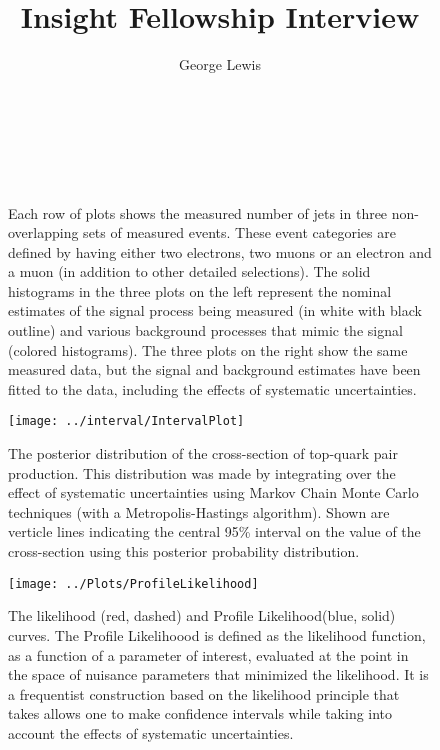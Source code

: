 \documentclass[11pt]{article}
\title{ Insight Fellowship Interview}
\author{ George Lewis }
\begin{document}
\maketitle


\begin{center}
  \begin{figure}[htbp]
     \\
     \\
     \\
    \caption{Each row of plots shows the measured number of jets in three non-overlapping sets of measured events. These event categories are defined by having either two electrons, two muons or an electron and a muon (in addition to other detailed selections).  The solid histograms in the three plots on the left represent the nominal estimates of the signal process being measured (in white with black outline) and various background processes that mimic the signal (colored histograms).  The three plots on the right show the same measured data, but the signal and background estimates have been fitted to the data, including the effects of systematic uncertainties.  }
  \end{figure}
\end{center}
\clearpage
\newpage



\begin{figure}[htbp]
  \begin{center}
    \texttt{[image: ../interval/IntervalPlot]}
    \caption{The posterior distribution of the cross-section of top-quark pair production.  This distribution was made by integrating over the effect of systematic uncertainties using Markov Chain Monte Carlo techniques (with a Metropolis-Hastings algorithm).  Shown are verticle lines indicating the central 95\% interval on the value of the cross-section using this posterior probability distribution.}
  \texttt{[image: ../Plots/ProfileLikelihood]}
    \caption{The likelihood (red, dashed) and Profile Likelihood(blue, solid) curves.  The Profile Likelihoood is defined as the likelihood function, as a function of a parameter of interest, evaluated at the point in the space of nuisance parameters that minimized the likelihood.  It is a frequentist construction based on the likelihood principle that takes allows one to make confidence intervals while taking into account the effects of systematic uncertainties.}
  \end{center}
\end{figure}
\clearpage
\newpage
\end{document}
